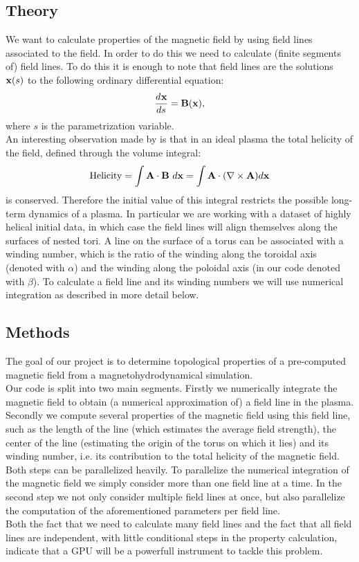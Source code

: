 \documentclass{article}
\newcommand{\Dif}[3][ ]{\ensuremath{\frac{d^{#1} #2}{{d #3}^{#1}}}}
\renewcommand{\vec}{\bold}
\begin{document}
\subsection{Theory}
We want to calculate properties of the magnetic field by using field lines associated to the field. In order to do this we need to calculate (finite segments of) field lines. To do this it is enough to note that field lines are the solutions $\vec x(s)$ to the following ordinary differential equation:
\[\Dif{\vec x}{s} = \vec B(\vec x),\]
where $s$ is the parametrization variable.\\
An interesting observation made by \cite{taylor1986relaxation} is that in an ideal plasma the total helicity of the field, defined through the volume integral:
\[
\text{Helicity} = \int\vec{A}\cdot\vec{B}\ d\vec{x} = \int\vec{A}\cdot (\nabla\times\vec{A})d\vec{x}
\]
is conserved. Therefore the initial value of this integral restricts the possible long-term dynamics of a plasma. In particular we are working with a dataset of highly helical initial data, in which case the field lines will align themselves along the surfaces of nested tori. A line on the surface of a torus can be associated with a winding number, which is the ratio of the winding along the toroidal axis (denoted with $\alpha$) and the winding along the poloidal axis (in our code denoted with $\beta$). To calculate a field line and its winding numbers we will use numerical integration as described in more detail below.


\subsection{Methods}
The goal of our project is to determine topological properties of a pre-computed magnetic field from a magnetohydrodynamical simulation.\\
Our code is split into two main segments. Firstly we numerically integrate the magnetic field to obtain (a numerical approximation of) a field line in the plasma. 
Secondly we compute several properties of the magnetic field using this field line, such as the length of the line (which estimates the average field strength), the center of the line (estimating the origin of the torus on which it lies) and its winding number, i.e. its contribution to the total helicity of the magnetic field.\\
Both steps can be parallelized heavily. To parallelize the numerical integration of the magnetic field we simply consider more than one field line at a time. In the second step we not only consider multiple field lines at once, but also parallelize the computation of the aforementioned parameters per field line.\\
Both the fact that we need to calculate many field lines and the fact that all field lines are independent, with little conditional steps in the property calculation, indicate that a GPU will be a powerfull instrument to tackle this problem.
\end{document}
